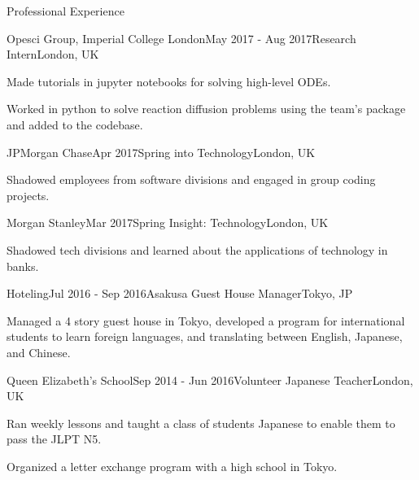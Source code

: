\documentclass[10pt]{resume} %
\begin{document}
\begin{rSection}{Professional Experience}

\begin{rSubsection}{Opesci Group, Imperial College London}{May 2017 - Aug 2017}{Research Intern}{London, UK}
    \item Made tutorials in jupyter notebooks for solving high-level ODEs.
    \item Worked in python to solve reaction diffusion problems using the team's package and added to the codebase.
\end{rSubsection}


\begin{rSubsection}{JPMorgan Chase}{Apr 2017}{Spring into Technology}{London, UK}
    \item Shadowed employees from software divisions and engaged in group coding projects.
\end{rSubsection}


\begin{rSubsection}{Morgan Stanley}{Mar 2017}{Spring Insight: Technology}{London, UK}
    \item Shadowed tech divisions and learned about the applications of technology in banks.
\end{rSubsection}


\begin{rSubsection}{Hoteling}{Jul 2016 - Sep 2016}{Asakusa Guest House Manager}{Tokyo, JP}
    \item Managed a 4 story guest house in Tokyo, developed a program for international students to learn foreign languages, and translating between English, Japanese, and Chinese.
\end{rSubsection}


\begin{rSubsection}{Queen Elizabeth's School}{Sep 2014 - Jun 2016}{Volunteer Japanese Teacher}{London, UK}
    \item Ran weekly lessons and taught a class of students Japanese to enable them to pass the JLPT N5.
    \item Organized a letter exchange program with a high school in Tokyo.
\end{rSubsection}


\end{rSection}
\end{document}
